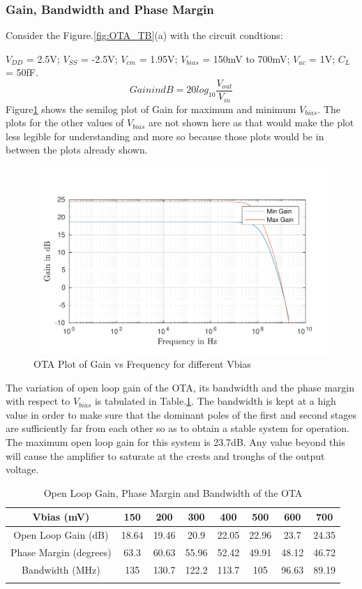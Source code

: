 \subsubsection{Gain, Bandwidth and Phase Margin}
Consider the Figure.\ref{fig:OTA_TB}(a) with the circuit condtions:

$V_{DD}$ = 2.5V; $V_{SS}$ = -2.5V; $V_{cm}$ = 1.95V; $V_{bias}$ = 150mV to 700mV;  $V_{ac}$ = 1V; $C_{L}$ = 50fF.
$$Gain in dB = 20 log_{10}\frac{V_{out}}{V_{in}}$$
Figure\ref{fig:OTA_Gain} shows the semilog plot of Gain for maximum and minimum $V_{bias}$. The plots for the other values of $V_{bias}$ are not shown here as that would make the plot less legible for understanding and more so because those plots would be in between the plots already shown.

\begin{figure} [H]
\centering
\includegraphics[scale=1]{Figures/Plots/OTA_Gain.pdf}
\caption{OTA Plot of Gain vs Frequency for different Vbias}
\label{fig:OTA_Gain}
\end{figure}

The variation of open loop gain of the OTA, its bandwidth and the phase margin with respect to $V_{bias}$ is tabulated in Table.\ref{tab:OTA_gain_bw_pm}. The bandwidth is kept at a high value in order to make sure that the dominant poles of the first and second stages are sufficiently far from each other so as to obtain a stable system for operation. The maximum open loop gain for this system is 23.7dB. Any value beyond this will cause the amplifier to saturate at the crests and troughs of the output voltage.

\begin{table} [H]
\centering
\begin{tabular}{@{}cccccccc@{}}
\toprule
Vbias (mV)					& 150		& 200		& 300		& 400		& 500		& 600		& 700 \\ \midrule
Open Loop Gain (dB)			& 18.64		& 19.46		& 20.9		& 22.05		& 22.96		& 23.7		& 24.35 \\
Phase Margin (degrees)		& 63.3		& 60.63		& 55.96		& 52.42		& 49.91		& 48.12		& 46.72 \\
Bandwidth (MHz)				& 135		& 130.7		& 122.2		& 113.7		& 105		& 96.63		& 89.19 \\
\bottomrule
\label{tab:OTA_gain_bw_pm}
\end{tabular}
\caption{Open Loop Gain, Phase Margin and Bandwidth of the OTA}
\end{table}

